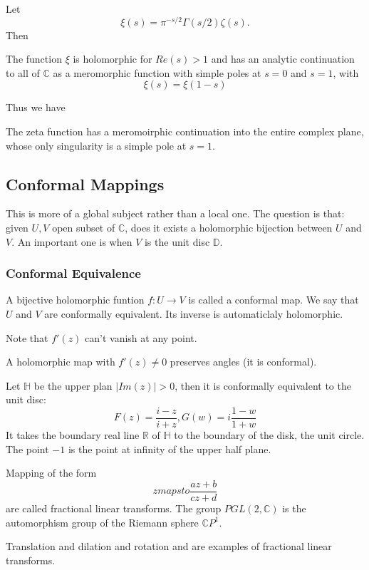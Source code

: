 \documentclass[main.tex]{subfiles}
\begin{document}
Let 
$$
\xi(s) = \pi^{-s/2}\Gamma(s/2)\zeta(s).
$$
Then 
\begin{theorem}
The function $\xi$ is holomorphic for $Re(s) > 1$ and has an analytic continuation to all of $\mathbb{C}$ as a meromorphic function with simple poles at $s = 0$ and $s = 1$, with 
$$
\xi(s) = \xi(1-s)
$$
\end{theorem}

Thus we have 
\begin{theorem}
The zeta function has a meromoirphic continuation into the entire complex plane, whose only singularity is a simple pole at $s = 1$.
\end{theorem}


\subsection{Conformal Mappings}
This is more of a global subject rather than a local one. The question is that: given $U, V$ open subset of $\mathbb{C}$, does it exists a holomorphic bijection between $U$ and $V$. An important one is when $V$ is the unit disc $\mathbb{D}$.

\subsubsection{Conformal Equivalence}
A bijective holomorphic funtion $f: U \rightarrow V$ is called a conformal map. We say that $U$ and $V$ are conformally equivalent. Its inverse is automaticlaly holomorphic.

Note that $f'(z)$ can't vanish at any point.

A holomorphic map with $f'(z) \neq 0$ preserves angles (it is conformal).

\begin{example}
Let $\mathbb{H}$ be the upper plan $|Im (z)| > 0$, then it is conformally equivalent to the unit disc:
$$
F(z) = \frac{i -z}{i + z}, G(w) = i \frac{1-w}{1+w}
$$
It takes the boundary real line $\mathbb{R}$ of $\mathbb{H}$ to the boundary of the disk, the unit circle. The point $-1$ is the point at infinity of the upper half plane.
\end{example}

Mapping of the form 
$$
z mapsto \frac{az + b}{cz + d}
$$
are called fractional linear transforms. The group $PGL(2, \mathbb{C})$ is the automorphism group of the Riemann sphere $\mathbb{C}P^1$.

Translation and dilation and rotation and are examples of fractional linear transforms.
\end{document}
